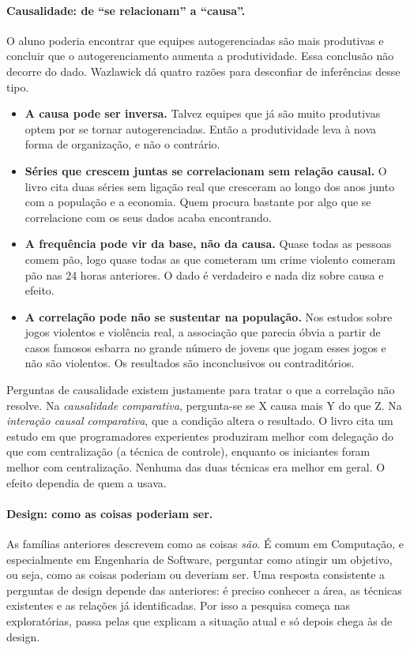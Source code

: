 \documentclass[10pt,a4paper]{extarticle}
\theoremstyle{definition}
\begin{document}
\paragraph{Causalidade: de \enquote{se relacionam} a \enquote{causa}.} O aluno poderia encontrar que equipes autogerenciadas são mais produtivas e concluir que o autogerenciamento aumenta a produtividade. Essa conclusão não decorre do dado. Wazlawick dá quatro razões para desconfiar de inferências desse tipo.
\begin{itemize}
  \item \textbf{A causa pode ser inversa.} Talvez equipes que já são muito produtivas optem por se tornar autogerenciadas. Então a produtividade leva à nova forma de organização, e não o contrário.
  \item \textbf{Séries que crescem juntas se correlacionam sem relação causal.} O livro cita duas séries sem ligação real que cresceram ao longo dos anos junto com a população e a economia. Quem procura bastante por algo que se correlacione com os seus dados acaba encontrando.
  \item \textbf{A frequência pode vir da base, não da causa.} Quase todas as pessoas comem pão, logo quase todas as que cometeram um crime violento comeram pão nas 24 horas anteriores. O dado é verdadeiro e nada diz sobre causa e efeito.
  \item \textbf{A correlação pode não se sustentar na população.} Nos estudos sobre jogos violentos e violência real, a associação que parecia óbvia a partir de casos famosos esbarra no grande número de jovens que jogam esses jogos e não são violentos. Os resultados são inconclusivos ou contraditórios.
\end{itemize}
Perguntas de causalidade existem justamente para tratar o que a correlação não resolve. Na \emph{causalidade comparativa}, pergunta-se se X causa mais Y do que Z. Na \emph{interação causal comparativa}, que a condição altera o resultado. O livro cita um estudo em que programadores experientes produziram melhor com delegação do que com centralização (a técnica de controle), enquanto os iniciantes foram melhor com centralização. Nenhuma das duas técnicas era melhor em geral. O efeito dependia de quem a usava.

\paragraph{Design: como as coisas poderiam ser.} As famílias anteriores descrevem como as coisas \emph{são}. É comum em Computação, e especialmente em Engenharia de Software, perguntar como atingir um objetivo, ou seja, como as coisas poderiam ou deveriam ser. Uma resposta consistente a perguntas de design depende das anteriores: é preciso conhecer a área, as técnicas existentes e as relações já identificadas. Por isso a pesquisa começa nas exploratórias, passa pelas que explicam a situação atual e só depois chega às de design.
\end{document}

